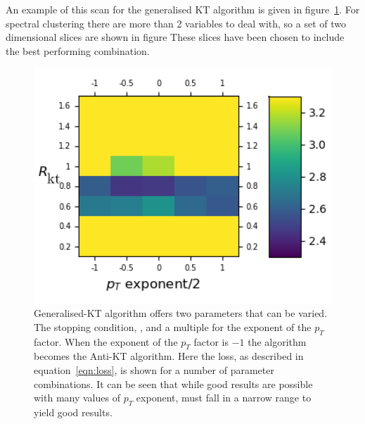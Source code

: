 An example of this scan for the generalised KT algorithm is given in figure~\ref{fig:scan_genkt}.
For spectral clustering there are more than 2 variables to deal with, 
so a set of two dimensional slices are shown in figure
These slices have been chosen to include the best performing combination.
    \begin{figure}[htp]
        \begin{minipage}[c]{0.5\textwidth}
            \includegraphics[width=1\textwidth]{graphics/trangle_scan_genkt.png}
        \end{minipage}\hfill
        \begin{minipage}[c]{0.45\textwidth}
            \caption{Generalised-KT algorithm offers two parameters that can be varied.
                The stopping condition, \stoppingdeltar{}, and a multiple for the exponent of the \(p_T\) factor.
                When the exponent of the \(p_T\) factor is \(-1\) the algorithm becomes the Anti-KT algorithm.
                Here the loss, as described in equation~\ref{eqn:loss}, is shown for a number of parameter combinations.
                It can be seen that while good results are possible with many values of \(p_T\) exponent,
                \stoppingdeltar{} must fall in a narrow range to yield good results.
             }\label{fig:scan_genkt}
        \end{minipage}
    \end{figure}    

